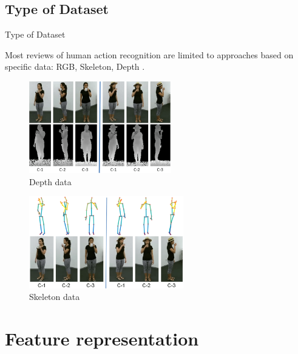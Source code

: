 \subsection{Type of Dataset}
\begin{frame}{Type of Dataset}

    Most reviews of human action recognition are limited to approaches based on specific data: RGB, Skeleton, Depth \cite{shahroudy2016ntu}.

    \begin{multicols}{2}
        \begin{figure}[htp]
            \centering
            \includegraphics[height=4cm]{images/paper/zhang2019comprehensive/depth_data_ex.png}
            \caption{Depth data}
            \label{fig:depth_data_ex}
        \end{figure}
        \begin{figure}[htp]
            \centering
            \includegraphics[height=4cm]{images/paper/zhang2019comprehensive/skeleton_data_ex.png}
            \caption{Skeleton data}
            \label{fig:skeleton_data_ex}
        \end{figure}
    \end{multicols}
\end{frame}

\section{Feature representation}
